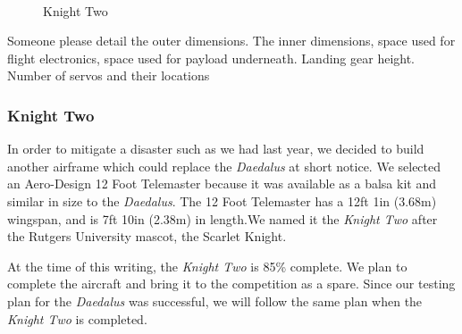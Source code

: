 \documentclass[10pt]{report}
\begin{document}
\begin{figure}
	\centering
\\
  	\label{fig:knighttwo}
  	\caption[Knight Two]{Knight Two}

\end{figure}
Someone please detail the outer dimensions. The inner dimensions, space used for flight electronics, space used for payload underneath. Landing gear height. Number of servos and their locations

\subsubsection{Knight Two}

In order to mitigate a disaster such as we had last year, we decided to build another airframe which could replace the \emph{Daedalus} at short notice. We selected an Aero-Design 12 Foot Telemaster \cite{aerodesign} because it was available as a balsa kit and similar in size to the \emph{Daedalus}. The 12 Foot Telemaster has a 12ft 1in (3.68m) wingspan, and is 7ft 10in (2.38m) in length.We named it the \emph{Knight Two} after the Rutgers University mascot, the Scarlet Knight.

At the time of this writing, the \emph{Knight Two} is 85\% complete. We plan to complete the aircraft and bring it to the competition as a spare.  
Since our testing plan for the \emph{Daedalus} was successful, we will follow the same plan when the \emph{Knight Two} is completed.
\end{document}
